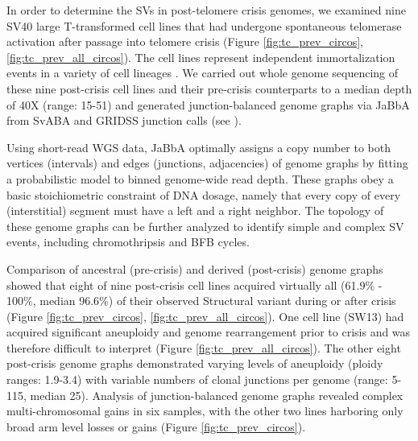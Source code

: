 \documentclass[phd,tocprelim]{cornell}
\begin{document}
In order to determine the SVs in post-telomere crisis genomes, we examined nine SV40 large T-transformed cell lines that had undergone spontaneous telomerase activation after passage into telomere crisis (Figure \ref{fig:tc_prev_circos}, \ref{fig:tc_prev_all_circos}). The cell lines represent independent immortalization events in a variety of cell lineages \cite{Bryan1995-ik,Shay1989-ua,Counter1992-yg}. We carried out whole genome sequencing of these nine post-crisis cell lines and their pre-crisis counterparts to a median depth of 40X (range: 15-51) and generated junction-balanced genome graphs\cite{Hadi2020-um} via JaBbA from SvABA\cite{Wala2018-qa} and GRIDSS\cite{Cameron2021-db} junction calls (see ).

Using short-read WGS data, JaBbA optimally assigns a copy number to both vertices (intervals) and edges (junctions, adjacencies) of genome graphs by fitting a probabilistic model to binned genome-wide read depth. These graphs obey a basic stoichiometric constraint of DNA dosage, namely that every copy of every (interstitial) segment must have a left and a right neighbor. The topology of these genome graphs can be further analyzed to identify simple and complex SV events, including chromothripsis and BFB cycles.

Comparison of ancestral (pre-crisis) and derived (post-crisis) genome graphs showed that eight of nine post-crisis cell lines acquired virtually all (61.9\% - 100\%, median 96.6\%) of their observed Structural variant during or after crisis (Figure \ref{fig:tc_prev_circos}, \ref{fig:tc_prev_all_circos}). One cell line (SW13) had acquired significant aneuploidy and genome rearrangement prior to crisis and was therefore difficult to interpret (Figure \ref{fig:tc_prev_all_circos}). The other eight post-crisis genome graphs demonstrated varying levels of aneuploidy (ploidy ranges: 1.9-3.4) with variable numbers of clonal junctions per genome (range: 5-115, median 25). Analysis of junction-balanced genome graphs \cite{Hadi2020-um} revealed complex multi-chromosomal gains in six samples, with the other two lines harboring only broad arm level losses or gains (Figure \ref{fig:tc_prev_circos}).
\end{document}
